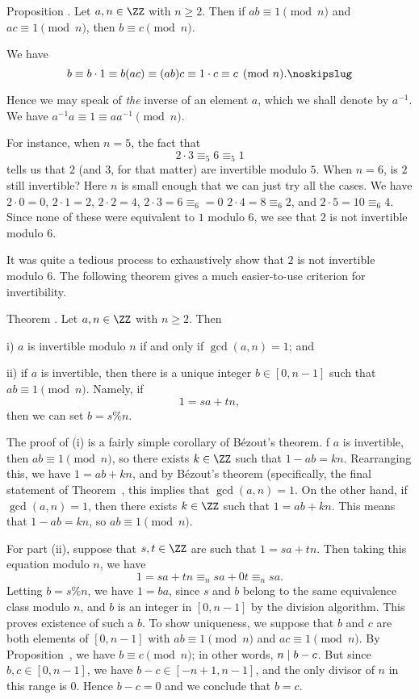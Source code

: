 \edef\propinversesunique{\the\thmcount}
\proclaim Proposition \advthm. Let $a,n\in \ZZ$ with $n\ge 2$. Then if $ab \equiv 1\pmod n$
and $ac\equiv 1\pmod n$, then $b\equiv c\pmod n$.

\proof We have
$$b \equiv b\cdot 1 \equiv b(ac) \equiv (ab)c \equiv 1\cdot c \equiv c\pmod n.\noskipslug$$

Hence we may speak of {\it the} inverse of an element $a$, which we shall denote by $a^{-1}$.
We have $a^{-1}a \equiv 1 \equiv a a^{-1}\pmod n$.

For instance, when $n=5$, the fact that
$$2\cdot 3 \equiv_5 6\equiv_5 1$$
tells us that $2$ (and $3$, for that matter) are invertible modulo $5$.
When $n=6$, is $2$ still invertible? Here $n$ is small enough that we can just try all the cases.
We have $2\cdot 0 = 0$, $2\cdot 1 = 2$, $2\cdot 2 = 4$, $2\cdot 3 = 6\equiv_6 = 0$
$2\cdot 4 = 8 \equiv_6 2$, and $2\cdot 5 = 10\equiv_6 4$. Since none of these were equivalent
to $1$ modulo $6$, we see that $2$ is not invertible modulo $6$.

It was quite a tedious process to exhaustively show that $2$ is not invertible modulo $6$. The following
theorem gives a much easier-to-use criterion for invertibility.

\edef\thminvertiblemodn{\the\thmcount}
\proclaim Theorem \advthm. Let $a,n\in \ZZ$ with $n\ge 2$. Then
\medskip
\item{i)} $a$ is invertible modulo $n$ if and only if $\gcd(a,n) = 1$; and
\smallskip
\item{ii)} if $a$ is invertible, then there is a unique integer $b\in [0,n-1]$ such that
$ab\equiv 1\pmod n$. Namely, if
$$1 = sa + tn,$$
then we can set $b = s\percent n$.
\medskip

\proof The proof of (i) is a fairly simple corollary of B\'ezout's theorem.
f $a$ is invertible, then $ab\equiv 1\pmod n$, so there exists $k\in \ZZ$ such that
$1-ab=kn$. Rearranging this, we have $1 = ab+kn$, and by B\'ezout's theorem (specifically,
the final statement of Theorem~{\thmbezout}, this implies that $\gcd(a,n) = 1$.
On the other hand, if $\gcd(a,n) = 1$, then there exists $k\in \ZZ$ such that
$1 = ab + kn$. This means that $1-ab = kn$, so $ab\equiv 1\pmod n$.

For part (ii), suppose that $s,t\in \ZZ$ are such that $1 = sa+tn$. Then
taking this equation modulo $n$, we have
$$ 1 = sa+tn \equiv_n sa + 0t \equiv_n sa.$$
Letting $b = s\percent n$, we have $1 = ba$, since $s$ and $b$ belong to the same
equivalence class modulo $n$, and $b$ is an integer in $[0,n-1]$ by the division algorithm.
This proves existence of such a $b$. To show uniqueness, we suppose that $b$ and $c$ are both
elements of $[0,n-1]$ with $ab\equiv 1 \pmod n$ and $ac\equiv 1\pmod n$. By
Proposition~{\propinversesunique}, we have $b\equiv c\pmod n$;
in other words, $n\mid b-c$. But since $b,c\in [0,n-1]$, we have $b-c\in [-n+1, n-1]$,
and the only divisor of $n$ in this range is $0$. Hence $b-c = 0$ and we conclude that $b=c$.\slug


